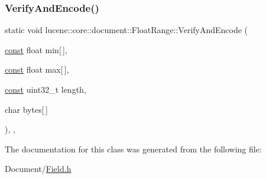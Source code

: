 \subsubsection{\texorpdfstring{Verify\+And\+Encode()}{VerifyAndEncode()}}
{\footnotesize\ttfamily static void lucene\+::core\+::document\+::\+Float\+Range\+::\+Verify\+And\+Encode (\begin{DoxyParamCaption}\item[{\mbox{\hyperlink{ZlibCrc32_8h_a2c212835823e3c54a8ab6d95c652660e}{const}} float}]{min\mbox{[}$\,$\mbox{]},  }\item[{\mbox{\hyperlink{ZlibCrc32_8h_a2c212835823e3c54a8ab6d95c652660e}{const}} float}]{max\mbox{[}$\,$\mbox{]},  }\item[{\mbox{\hyperlink{ZlibCrc32_8h_a2c212835823e3c54a8ab6d95c652660e}{const}} uint32\+\_\+t}]{length,  }\item[{char}]{bytes\mbox{[}$\,$\mbox{]} }\end{DoxyParamCaption})\hspace{0.3cm}{\ttfamily [inline]}, {\ttfamily [static]}, {\ttfamily [private]}}



The documentation for this class was generated from the following file\+:\begin{DoxyCompactItemize}
\item 
Document/\mbox{\hyperlink{Document_2Field_8h}{Field.\+h}}\end{DoxyCompactItemize}
